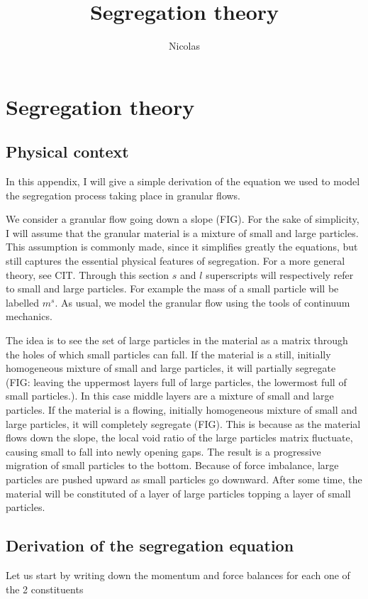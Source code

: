 \documentclass[11pt]{book}
\title{\textbf{Segregation theory}}
\author{Nicolas}
\date{}
\begin{document}
\chapter{Segregation theory}

\section{Physical context}

In this appendix, I will give a simple derivation of the equation we used to model the segregation process taking place in granular flows.

We consider a granular flow going down a slope (FIG). For the sake of simplicity, I will assume that the granular material is a mixture of small and large particles. This assumption is commonly made, since it simplifies greatly the equations, but still captures the essential physical features of segregation. For a more general theory, see CIT. Through this section $s$ and $l$ superscripts will respectively refer to small and large particles. For example the mass of a small particle will be labelled $m^s$.
As usual, we model the granular flow using the tools of continuum mechanics. 

The idea is to see the set of large particles in the material as a matrix through the holes of which small particles can fall. 
If the material is a still, initially homogeneous mixture of small and large particles, it will partially segregate (FIG: leaving the uppermost layers full of large particles, the lowermost full of small particles.). In this case middle layers are a mixture of small and large particles.
If the material is a flowing, initially homogeneous mixture of small and large particles, it will completely segregate (FIG). This is because as the material flows down the slope, the local void ratio of the large particles matrix fluctuate, causing small to fall into newly opening gaps. The result is a progressive migration of small particles to the bottom. Because of force imbalance, large particles are pushed upward as small particles go downward. After some time, the material will be constituted of a layer of large particles topping a layer of small particles.

\section{Derivation of the segregation equation}

Let us start by writing down the momentum and force balances for each one of the 2 constituents
\end{document}
